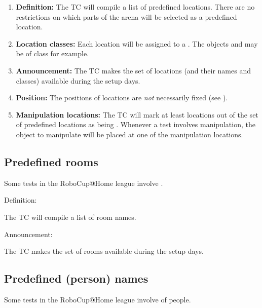 \begin{enumerate}
	\item \textbf{Definition:} The TC will compile a list of predefined locations. There are no restrictions on which parts of the arena will be selected as a predefined location.

	\item \textbf{Location classes:} Each location will be assigned to a . The objects  and  may be of class  for example. 

	\item \textbf{Announcement:} The TC makes the set of locations (and their names and classes) available during the setup days.

	\item \textbf{Position:} The positions of locations are \emph{not} necessarily fixed (see ).

	\item \textbf{Manipulation locations:} The TC will mark at least \NumLocations locations out of the set of predefined locations as being . Whenever a test involves manipulation, the object to manipulate will be placed at one of the manipulation locations. 
\end{enumerate}



\subsection{Predefined rooms}
\label{rule:scenario_rooms}
Some tests in the RoboCup@Home league involve . 
\begin{enumerate}
	{\bf\item Definition:} The TC will compile a list of room names.
	{\bf\item Announcement:} The TC makes the set of rooms available during the setup days.
\end{enumerate}



\subsection{Predefined (person) names}\label{rule:scenario_names}

Some tests in the RoboCup@Home league involve  of people. 

